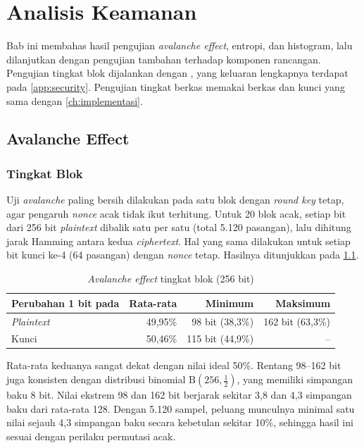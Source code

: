 \chapter{Analisis Keamanan}
\label{ch:analisis}

Bab ini membahas hasil pengujian \textit{avalanche effect}, entropi, dan histogram, lalu dilanjutkan dengan pengujian tambahan terhadap komponen rancangan. Pengujian tingkat blok dijalankan dengan , yang keluaran lengkapnya terdapat pada \cref{app:security}. Pengujian tingkat berkas memakai berkas dan kunci yang sama dengan \cref{ch:implementasi}.

\section{Avalanche Effect}

\subsection{Tingkat Blok}
Uji \textit{avalanche} paling bersih dilakukan pada satu blok dengan \textit{round key} tetap, agar pengaruh \textit{nonce} acak tidak ikut terhitung. Untuk 20 blok acak, setiap bit dari 256 bit \textit{plaintext} dibalik satu per satu (total 5.120 pasangan), lalu dihitung jarak Hamming antara kedua \textit{ciphertext}. Hal yang sama dilakukan untuk setiap bit kunci ke-4 (64 pasangan) dengan \textit{nonce} tetap. Hasilnya ditunjukkan pada \cref{tab:avalanche-blok}.

\begin{table}[H]
    \centering
    \caption{\textit{Avalanche effect} tingkat blok (256 bit)}
    \label{tab:avalanche-blok}
    \begin{tabular}{l r r r}
        \toprule
        \textbf{Perubahan 1 bit pada} & \textbf{Rata-rata} & \textbf{Minimum} & \textbf{Maksimum} \\
        \midrule
        \textit{Plaintext} & 49,95\% & 98 bit (38,3\%) & 162 bit (63,3\%) \\
        Kunci & 50,46\% & 115 bit (44,9\%) & -- \\
        \bottomrule
    \end{tabular}
\end{table}

Rata-rata keduanya sangat dekat dengan nilai ideal 50\%. Rentang 98--162 bit juga konsisten dengan distribusi binomial $\mathrm{B}(256, \tfrac12)$, yang memiliki simpangan baku 8 bit. Nilai ekstrem 98 dan 162 bit berjarak sekitar 3,8 dan 4,3 simpangan baku dari rata-rata 128. Dengan 5.120 sampel, peluang munculnya minimal satu nilai sejauh 4,3 simpangan baku secara kebetulan sekitar 10\%, sehingga hasil ini sesuai dengan perilaku permutasi acak.

